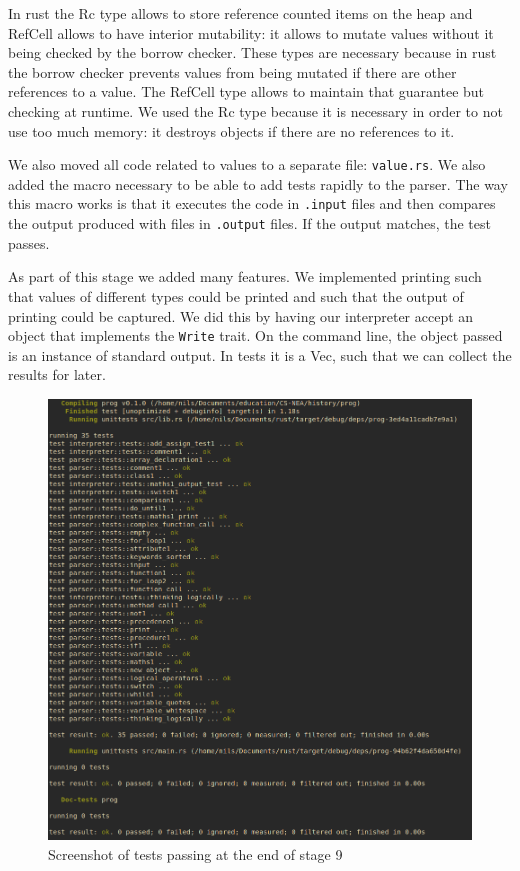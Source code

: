 \documentclass{article}
\begin{document}
In rust the Rc type allows to store reference counted items on the heap and
RefCell allows to have interior mutability: it allows to mutate values without
it being checked by the borrow checker. These types are necessary because in
rust the borrow checker prevents values from being mutated if there are other
references to a value. The RefCell type allows to maintain that guarantee but
checking at runtime. We used the Rc type because it is necessary in order to
not use too much memory: it destroys objects if there are no references to it.

We also moved all code related to values to a separate file: \texttt{value.rs}.
We also added the macro necessary to be able to add tests rapidly to the
parser. The way this macro works is that it executes the code in
\texttt{.input} files and then compares the output produced with files in
\texttt{.output} files. If the output matches, the test passes.

As part of this stage we added many features. We implemented printing such that
values of different types could be printed and such that the output of printing
could be captured. We did this by having our interpreter accept an object that
implements the \texttt{Write} trait. On the command line, the object passed is
an instance of standard output. In tests it is a Vec, such that we can collect
the results for later.

\begin{figure}
	\includegraphics[width=\textwidth]{stage9_test}
	\caption{Screenshot of tests passing at the end of stage 9}
	\label{fig:stage9_test}
\end{figure}
\end{document}
